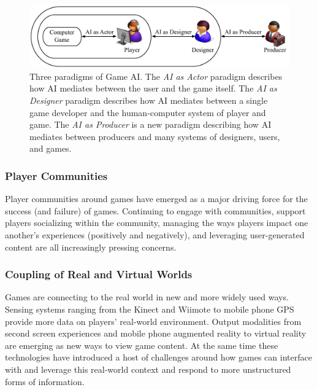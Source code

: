 \documentclass[conference]{IEEEtran}
\begin{document}
\begin{figure}
\centering
\includegraphics[scale=0.7]{metaphor}
\caption{Three paradigms of Game AI. The {\em AI as Actor} paradigm describes how AI mediates between the user and the game itself. The {\em AI as Designer} paradigm describes how AI mediates between a single game developer and the human-computer system of player and game. The {\em AI as Producer} is a new paradigm describing how AI mediates between producers and many systems of designers, users, and games.}
\label{fig:metaphor}
\end{figure}

\subsubsection{Player Communities}
Player communities around games have emerged as a major driving force for the success (and failure) of games. 
Continuing to engage with communities, support players socializing within the community, managing the ways players impact one another's experiences (positively and negatively), and leveraging user-generated content are all increasingly pressing concerns.


\subsubsection{Coupling of Real and Virtual Worlds}
Games are connecting to the real world in new and more widely used ways. 
Sensing systems ranging from the Kinect and Wiimote to mobile phone GPS provide more data on players' real-world environment. 
Output modalities from second screen experiences and mobile phone augmented reality to virtual reality are emerging as new ways to view game content. 
At the same time these technologies have introduced a host of challenges around how games can interface with and leverage this real-world context and respond to more unstructured forms of information.
\end{document}
